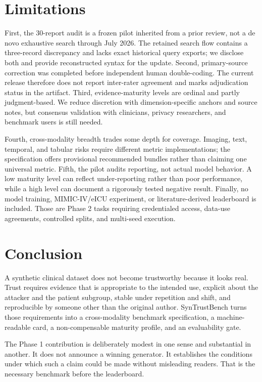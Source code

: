 \documentclass[11pt,letterpaper]{article}
\begin{document}
\section{Limitations}

First, the 30-report audit is a frozen pilot inherited from a prior review, not a de novo exhaustive search through July 2026. The retained search flow contains a three-record discrepancy and lacks exact historical query exports; we disclose both and provide reconstructed syntax for the update. Second, primary-source correction was completed before independent human double-coding. The current release therefore does not report inter-rater agreement and marks adjudication status in the artifact. Third, evidence-maturity levels are ordinal and partly judgment-based. We reduce discretion with dimension-specific anchors and source notes, but consensus validation with clinicians, privacy researchers, and benchmark users is still needed.

Fourth, cross-modality breadth trades some depth for coverage. Imaging, text, temporal, and tabular risks require different metric implementations; the specification offers provisional recommended bundles rather than claiming one universal metric. Fifth, the pilot audits reporting, not actual model behavior. A low maturity level can reflect under-reporting rather than poor performance, while a high level can document a rigorously tested negative result. Finally, no model training, MIMIC-IV/eICU experiment, or literature-derived leaderboard is included. Those are Phase 2 tasks requiring credentialed access, data-use agreements, controlled splits, and multi-seed execution.

\section{Conclusion}

A synthetic clinical dataset does not become trustworthy because it looks real. Trust requires evidence that is appropriate to the intended use, explicit about the attacker and the patient subgroup, stable under repetition and shift, and reproducible by someone other than the original author. SynTrustBench turns those requirements into a cross-modality benchmark specification, a machine-readable card, a non-compensable maturity profile, and an evaluability gate.

The Phase 1 contribution is deliberately modest in one sense and substantial in another. It does not announce a winning generator. It establishes the conditions under which such a claim could be made without misleading readers. That is the necessary benchmark before the leaderboard.
\end{document}
